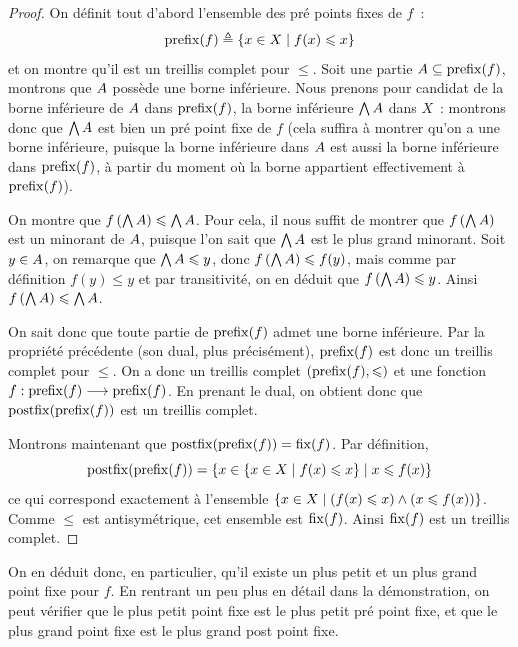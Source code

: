 \begin{proof}
  On définit tout d'abord l'ensemble des pré points fixes de $f$~:
  \[\operatorname{prefix}(f) \triangleq \left\{ x\in X \;\middle\vert\; f(x)\leqslant x \right\}\]
  et on montre qu'il est un treillis complet pour $\leq$. Soit une partie
  $A\subseteq\operatorname{prefix}(f)$, montrons que $A$ possède une borne
  inférieure. Nous prenons pour candidat de la borne inférieure de $A$ dans
  $\operatorname{prefix}(f)$, la borne inférieure $\bigwedge A$ dans $X$~: montrons donc que
  $\bigwedge A$ est bien un pré point fixe de $f$ (cela suffira à montrer qu'on
  a une borne inférieure, puisque la borne inférieure dans $A$ est aussi la
  borne inférieure dans $\operatorname{prefix}(f)$, à partir du moment où la borne appartient
  effectivement à $\operatorname{prefix}(f)$).

  On montre que $f\left(\bigwedge A\right) \leqslant \bigwedge A$. Pour cela, il
  nous suffit de montrer que $f\left(\bigwedge A\right)$ est un minorant de
  $A$, puisque l'on sait que $\bigwedge A$ est le plus grand minorant.
  Soit $y\in A$, on remarque que $\bigwedge A \leqslant y$, donc
  $f\left(\bigwedge A\right) \leqslant f(y)$, mais comme par définition $f(y)\leq y$
  et par transitivité, on en déduit que $f\left(\bigwedge A\right) \leqslant y$.
  Ainsi $f\left(\bigwedge A\right) \leqslant \bigwedge A$.

  On sait donc que toute partie de $\operatorname{prefix}(f)$ admet une borne inférieure. Par
  la propriété précédente (son dual, plus précisément), $\operatorname{prefix}(f)$ est donc
  un treillis complet pour $\leq$. On a donc un treillis complet
  $(\operatorname{prefix}(f),\leqslant)$ et une fonction $f : \displaystyle \operatorname{prefix}(f) \longrightarrow \operatorname{prefix}(f)$.
  En prenant le dual, on obtient donc que $\operatorname{postfix}(\operatorname{prefix}(f))$ est un treillis
  complet.

  Montrons maintenant que $\operatorname{postfix}(\operatorname{prefix}(f)) = \operatorname{fix}(f)$. Par définition,
  \[\operatorname{postfix}(\operatorname{prefix}(f)) =
  \left\{ x\in \left\{ x\in X \;\middle\vert\; f(x)\leqslant x \right\} \;\middle\vert\; x \leqslant f(x) \right\}\]
  ce qui correspond exactement à l'ensemble
  $\left\{ x\in X \;\middle\vert\; (f(x) \leqslant x) \land (x \leqslant f(x)) \right\}$. Comme $\leq$ est
  antisymétrique, cet ensemble est $\operatorname{fix}(f)$. Ainsi $\operatorname{fix}(f)$ est un treillis
  complet.
\end{proof}

\begin{remark}
  On en déduit donc, en particulier, qu'il existe un plus petit et un plus grand
  point fixe pour $f$. En rentrant un peu plus en détail dans la démonstration,
  on peut vérifier que le plus petit point fixe est le plus petit pré point
  fixe, et que le plus grand point fixe est le plus grand post point fixe.
\end{remark}

